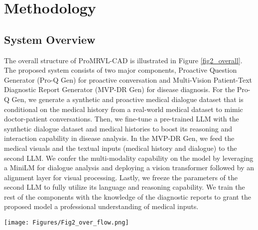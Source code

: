 
\section{Methodology}
\subsection{System Overview}

The overall structure of ProMRVL-CAD is illustrated in Figure \ref{fig2_overall}. The proposed system consists of two major components, Proactive Question Generator (Pro-Q Gen) for proactive conversation and Multi-Vision Patient-Text Diagnostic Report Generator (MVP-DR Gen) for disease diagnosis. For the Pro-Q Gen, we generate a synthetic and proactive medical dialogue dataset that is conditional on the medical history from a real-world medical dataset to mimic doctor-patient conversations. Then, we fine-tune a pre-trained LLM with the synthetic dialogue dataset and medical histories to boost its reasoning and interaction capability in disease analysis. In the MVP-DR Gen, we feed the medical visuals and the textual inputs (medical history and dialogue) to the second LLM. We confer the multi-modality capability on the model by leveraging a MiniLM \cite{10.5555/3495724.3496209} for dialogue analysis and deploying a vision transformer followed by an alignment layer for visual processing. Lastly, we freeze the parameters of the second LLM to fully utilize its language and reasoning capability. We train the rest of the components with the knowledge of the diagnostic reports to grant the proposed model a professional understanding of medical inputs.

\begin{figure*}[h]
\centering
\texttt{[image: Figures/Fig2\_over\_flow.png]}
\caption{The architecture of ProMRVL-CAD. It consists of two modules: Pro-Q Gen to prompt patients to provide more informative inputs and MVP-DR Gen to generate diagnostic reports from multi-modality inputs. }
\label{fig2_overall}
\end{figure*}

